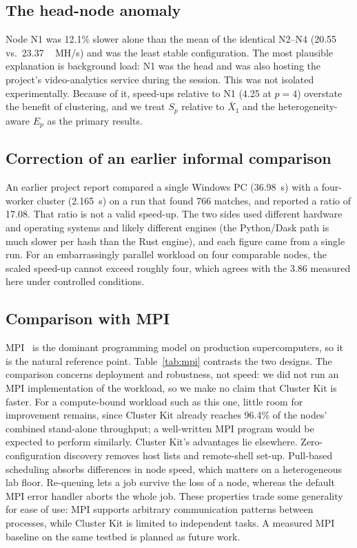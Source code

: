 \documentclass[conference,10pt]{IEEEtran}
\newcommand{\MHs}{\,MH/s}
\begin{document}
\subsection{The head-node anomaly}\label{sec:anomaly}
Node N1 was 12.1\% slower alone than the mean of the identical N2--N4 (\SI{20.55}{} vs.\ \SI{23.37}{\MHs}) and was the least stable configuration. The most plausible explanation is background load: N1 was the head and was also hosting the project's video-analytics service during the session. This was not isolated experimentally. Because of it, speed-ups relative to N1 (4.25 at $p = 4$) overstate the benefit of clustering, and we treat $S_p$ relative to $\bar{X}_1$ and the heterogeneity-aware $E_p$ as the primary results.

\subsection{Correction of an earlier informal comparison}\label{sec:informal}
An earlier project report compared a single Windows PC (\SI{36.98}{s}) with a four-worker cluster (\SI{2.165}{s}) on a run that found 766 matches, and reported a ratio of 17.08. That ratio is not a valid speed-up. The two sides used different hardware and operating systems and likely different engines (the Python/Dask path is much slower per hash than the Rust engine), and each figure came from a single run. For an embarrassingly parallel workload on four comparable nodes, the scaled speed-up cannot exceed roughly four, which agrees with the 3.86 measured here under controlled conditions.

\subsection{Comparison with MPI}\label{sec:mpi}
MPI~\cite{mpi} is the dominant programming model on production supercomputers, so it is the natural reference point. Table~\ref{tab:mpi} contrasts the two designs. The comparison concerns deployment and robustness, not speed: we did not run an MPI implementation of the workload, so we make no claim that Cluster Kit is faster. For a compute-bound workload such as this one, little room for improvement remains, since Cluster Kit already reaches 96.4\% of the nodes' combined stand-alone throughput; a well-written MPI program would be expected to perform similarly. Cluster Kit's advantages lie elsewhere. Zero-configuration discovery removes host lists and remote-shell set-up. Pull-based scheduling absorbs differences in node speed, which matters on a heterogeneous lab floor. Re-queuing lets a job survive the loss of a node, whereas the default MPI error handler aborts the whole job. These properties trade some generality for ease of use: MPI supports arbitrary communication patterns between processes, while Cluster Kit is limited to independent tasks. A measured MPI baseline on the same testbed is planned as future work.
\end{document}
